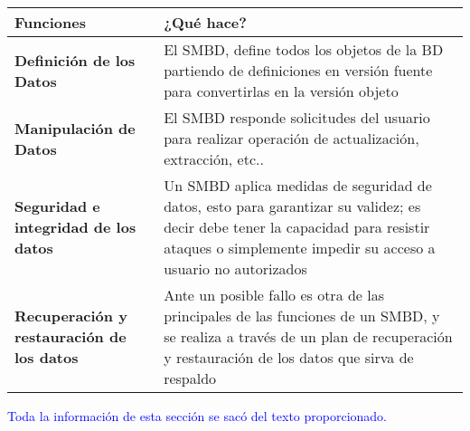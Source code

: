 \begin{table}[h]
\centering
\small 
\begin{tabularx}{\textwidth}{|X|X|}
\hline
\textbf{Funciones} & \textbf{\textcolor{myPurple}{¿Qué hace?}} \\
\hline
\textbf{Definición de los Datos} & El SMBD, define todos los objetos de la BD partiendo de definiciones en versión fuente para convertirlas en la versión objeto \\
\hline
\textbf{Manipulación de Datos} & El SMBD responde solicitudes del usuario para realizar operación de actualización, extracción, etc.. \\
\hline
\textbf{Seguridad e integridad de los datos} & Un SMBD aplica medidas de seguridad de datos, esto para garantizar su validez; es decir debe tener la capacidad para resistir ataques o simplemente impedir su acceso a usuario no autorizados \\
\hline
\textbf{Recuperación y restauración de los datos} & Ante un posible fallo es otra de las principales de las funciones de un SMBD, y se realiza a través de un plan de recuperación y restauración de los datos que sirva de respaldo \\
\hline
\end{tabularx}
\label{tab:Funciones_vs_}
\end{table}

\newpage

\textcolor{blue}{Toda la información de esta sección se sacó del texto proporcionado. \cite{UAPA}}
\\